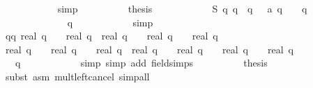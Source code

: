 \begin{isabellebody}
\ \ \ \ \ \ \ \ \ \ \isamarkupfalse%
\ simp\isanewline
\ \ \ \ \ \ \ \ \isamarkupfalse%
\ {\isacharquery}thesis\isanewline
\ \ \ \ \ \ \ \ \ \ \isamarkupfalse%
\ {\isacharbackquoteopen}{\isacharquery}S\ q\ q\ {\isacharequal}\ q\ {\isacharminus}\ {}{\isacharbackquoteclose}\ {\isacharbackquoteopen}a\ q\ {\isacharequal}\ {}\ {\isacharminus}\ {}{\isacharslash}q{\isacharbackquoteclose}\isanewline
\ \ \ \ \ \ \ \ \ \ \isamarkupfalse%
\ {\isacharbackquoteopen}{}\ {\isasymle}\ q{\isacharbackquoteclose}\isanewline
\ \ \ \ \ \ \ \ \ \ \isamarkupfalse%
\ simp\isanewline
\ \ \ \ \ \ \isamarkupfalse%
\isanewline
\isanewline
\ \ \ \ \ \ \isamarkupfalse%
\ qq{\isacharcolon}\ {\isachardoublequoteopen}{\isacharparenleft}real\ q\ {\isacharminus}\ {}\ {\isacharslash}\ real\ q{\isacharparenright}\ {\isacharslash}\ {\isacharparenleft}real\ q\ {\isacharplus}\ {}{\isacharparenright}\ {\isacharequal}\ {\isacharparenleft}real\ q\ {\isacharminus}\ {}{\isacharparenright}\ {\isacharslash}\ real\ q{\isachardoublequoteclose}\isanewline
\ \ \ \ \ \ \isamarkupfalse%
{\isacharminus}\isanewline
\ \ \ \ \ \ \ \ \isamarkupfalse%
\ {\isachardoublequoteopen}{\isacharparenleft}real\ q\ {\isacharplus}\ {}{\isacharparenright}\ {\isacharasterisk}\ {\isacharparenleft}{\isacharparenleft}real\ q\ {\isacharminus}\ {}\ {\isacharslash}\ real\ q{\isacharparenright}\ {\isacharslash}\ {\isacharparenleft}real\ q\ {\isacharplus}\ {}{\isacharparenright}{\isacharparenright}\ {\isacharequal}\ {\isacharparenleft}real\ q\ {\isacharplus}\ {}{\isacharparenright}\ {\isacharasterisk}\ {\isacharparenleft}{\isacharparenleft}real\ q\ {\isacharminus}\ {}{\isacharparenright}\ {\isacharslash}\ real\ q{\isacharparenright}{\isachardoublequoteclose}\isanewline
\ \ \ \ \ \ \ \ \ \ \isamarkupfalse%
\ {\isacharbackquoteopen}{}\ {\isasymle}\ q{\isacharbackquoteclose}\isanewline
\ \ \ \ \ \ \ \ \ \ \isamarkupfalse%
\ simp\ {\isacharparenleft}simp\ add{\isacharcolon}\ field{\isacharunderscore}simps{\isacharparenright}\isanewline
\ \ \ \ \ \ \ \ \isamarkupfalse%
\ {\isacharquery}thesis\isanewline
\ \ \ \ \ \ \ \ \ \ \isamarkupfalse%
\ {\isacharparenleft}subst\ {\isacharparenleft}asm{\isacharparenright}\ mult{\isacharunderscore}left{\isacharunderscore}cancel{\isacharcomma}\ simp{\isacharunderscore}all{\isacharparenright}\isanewline

\end{isabellebody}

